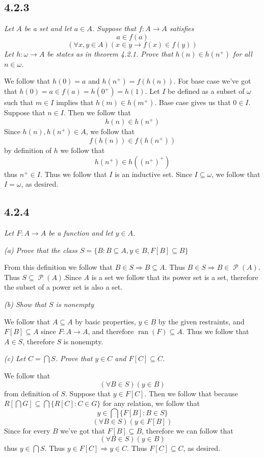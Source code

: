 \documentclass[11pt,oneside,titlepage]{book}
\DeclareMathOperator \pow {\mathcal {P}}
\DeclareMathOperator \ra {\Rightarrow}
\DeclareMathOperator \ran {ran}
\begin{document}
\subsection*{4.2.3}

\textit{Let $A$ be a set and let $a \in A$. Suppose that $f: A \to A$ satisfies 
$$a \in f(a)$$
$$(\forall x, y \in A)(x \in y \to f(x) \in f(y))$$
Let $h: \omega \to A$ be states as in theorem 4.2.1. Prove that $h(n) \in h(n^+)$ for
all $n \in \omega$.}

We follow that $h(0) = a$ and $h(n^+) = f(h(n))$. For base case we've got that
$h(0) = a \in f(a) = h(0^+) = h(1)$.
Let $I$ be defined as a subset of $\omega$  such that $m \in I$ implies
that $h(m) \in h(m^+)$. Base case gives us that $0 \in I$. Suppose that
$n \in I$. Then we follow that
$$h(n) \in h(n^+)$$
Since $h(n), h(n^+) \in A$, we follow that
$$f(h(n)) \in f(h(n^+))$$
by definition of $h$ we follow that
$$h(n^+) \in h((n^+)^+)$$
thus $n^+ \in I$. Thus we follow that $I$ is an inductive set. Since $I \subseteq \omega$,
we follow that $I = \omega$, as desired.

\subsection*{4.2.4}

\textit{Let $F: A \to A$ be a function and let $y \in A$.}

\textit{(a) Prove that the class $S = \{B: B \subseteq A, y \in B, F[B] \subseteq B\}$}

From this definition we follow that $B \in S \ra B \subseteq A$. Thus $B \in S \ra
B \in \pow(A)$. Thus $S \subseteq \pow(A)$.Since $A$ is a set we follow that its power set is a set,
therefore the subset of a power set is also a set.

\textit{(b) Show that $S$ is nonempty}

We follow that $A \subseteq A$ by basic properties, $y \in B$ by the given restraints,
and $F[B] \subseteq A$ since $F: A \to A$, and therefore $\ran(F) \subseteq A$. Thus
we follow that $A \in S$, therefore $S$ is nonempty.

\textit{(c) Let $C = \bigcap S$. Prove that $y \in C$ and $F[C] \subseteq C$.}

We follow that
$$(\forall B \in S)(y \in B)$$
from definition of $S$. Suppose that $y \in F[C]$. Then we follow that
because $R[\bigcap G] \subseteq \bigcap\{R[C]: C \in G\}$ for any relation, we follow that
$$y \in \bigcap\{F[B]: B \in S\}$$
$$(\forall B \in S)(y \in F[B])$$
Since for every $B$ we've got that $F[B] \subseteq B$, therefore we can follow that
$$(\forall B \in S)(y \in B)$$
thus $y \in \bigcap S$. Thus $y \in F[C] \ra y \in C$. Thus $F[C] \subseteq C$, as desired.
\end{document}

